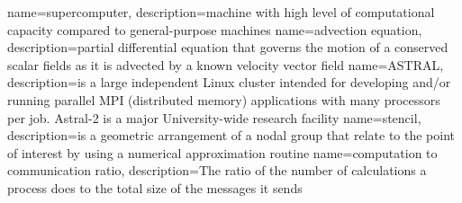 
{
	name={supercomputer},
	description={machine with high level of computational capacity compared to general-purpose machines}
}
{
	name={advection equation},
	description={partial differential equation that governs the motion of a conserved scalar fields as it is advected by a known velocity vector field \cite{bib:advection}}
}
{
	name={ASTRAL},
	description={is a large independent Linux cluster intended for developing and/or running parallel \gls{MPI} (distributed memory) applications with many processors per job. Astral-2 is a major University-wide research facility \cite{bib:astral}}
}
{
	name={stencil},
	description={is a geometric arrangement of a nodal group that relate to the point of interest by using a numerical approximation routine \cite{bib:stencil}}
}
{
	name={computation to communication ratio},
	description={The ratio of the number of calculations a process does to the total size of the messages it sends \cite{bib:hpc-glossary}}
}